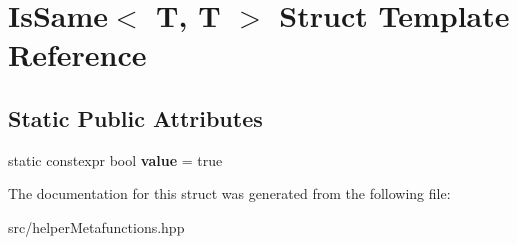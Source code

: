 \hypertarget{structIsSame_3_01T_00_01T_01_4}{}\section{Is\+Same$<$ T, T $>$ Struct Template Reference}
\label{structIsSame_3_01T_00_01T_01_4}
\subsection*{Static Public Attributes}
\begin{DoxyCompactItemize}
\item 
\mbox{\label{structIsSame_3_01T_00_01T_01_4_a5bf946e81f1012766d8c1f23f85f562f}} 
static constexpr bool {\bfseries value} = true
\end{DoxyCompactItemize}


The documentation for this struct was generated from the following file\+:\begin{DoxyCompactItemize}
\item 
src/helper\+Metafunctions.\+hpp\end{DoxyCompactItemize}
